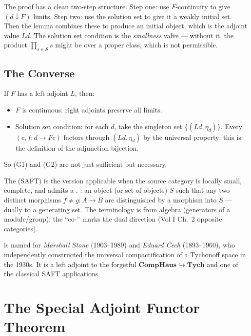 \begin{dialog}
The proof has a clean two-step structure. Step one: use $F$-continuity to
give $(d \downarrow F)$ limits. Step two: use the solution set to give it
a weakly initial set. Then the lemma combines these to produce an initial
object, which is the adjoint value $Ld$. The solution set condition is the
\emph{smallness} valve --- without it, the product $\prod_{s \in \mathcal{S}}
s$ might be over a proper class, which is not permissible.
\end{dialog}

\subsection{The Converse}

If $F$ has a left adjoint $L$, then:
\begin{itemize}
  \item $F$ is continuous: right adjoints preserve all limits.
  \item Solution set condition: for each $d$, take the singleton set
        $\{(Ld, \eta_d)\}$. Every $(c, f: d \to Fc)$ factors through
        $(Ld, \eta_d)$ by the universal property: this is the definition
        of the adjunction bijection.
\end{itemize}
So (G1) and (G2) are not just sufficient but necessary.


\begin{nameorigin}
The  (SAFT) is the version
applicable when the source category is locally small, complete, and
admits a . : an object (or set
of objects) $S$ such that any two distinct morphisms $f \neq g : A \to
B$ are distinguished by a morphism into $S$ — dually to a generating set.
The terminology is from algebra (generators of a module/group); the
``co-'' marks the dual direction (Vol I Ch.~2 opposite categories).

 is named for \emph{Marshall Stone}
(1903--1989) and \emph{Eduard Čech} (1893--1960), who independently
constructed the universal compactification of a Tychonoff space in
the 1930s. It is a left adjoint to the forgetful $\mathbf{CompHaus}
\hookrightarrow \mathbf{Tych}$ and one of the classical SAFT
applications.
\end{nameorigin}

\section{The Special Adjoint Functor Theorem}
\label{sec:saft-vol2}

